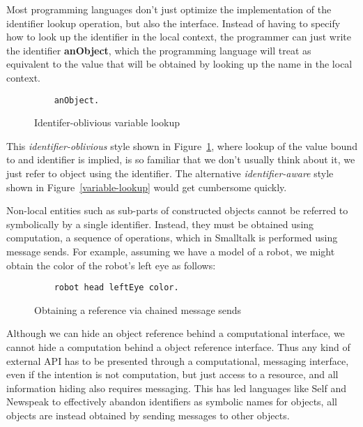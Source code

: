 \documentclass[preprint,authoryear]{acm_proc_article-sp}
\begin{document}
Most programming languages don't just optimize the implementation of the identifier
lookup operation, but also the interface.  Instead of having to specify how to
look up the identifier in the local context, the programmer can just write the
identifier {\bf anObject}, which the programming language will treat as equivalent to the
value that will be obtained by looking up the name in the local context.  


\begin{figure}[htbp]
\begin{center}
\begin{verbatim}
	anObject.
\end{verbatim}
\caption{Identifer-oblivious variable lookup}
\label{plain-identifier}
\end{center}
\end{figure}

This  {\em identifier-oblivious} style shown in Figure~\ref{plain-identifier}, where lookup of the value bound to and
identifier is implied, is so familiar that we don't usually think about it, we just
refer to object using the identifier.
  The 
alternative {\em identifier-aware} style shown in Figure~\ref{variable-lookup} would get cumbersome quickly.

Non-local entities such as sub-parts of constructed objects 
cannot be referred to symbolically by a single identifier.
Instead, they must be obtained using computation, a 
sequence of operations, which in Smalltalk is performed using message sends.
For example, assuming we have a model of a robot, we might obtain the
color of the robot's left eye as follows:

\begin{figure}[htbp]
\begin{center}
\begin{verbatim}
	robot head leftEye color.
\end{verbatim}
\caption{Obtaining a reference via chained message sends}
\label{non-local-reference}
\end{center}
\end{figure}


Although we can hide an object reference behind a computational interface, we cannot
hide a computation behind a object reference interface.
Thus any kind of external API has to be presented through a computational, messaging 
interface, even if the intention is not computation, but just access to a resource,
  and all information hiding also requires messaging.  This has led languages
like Self \cite{UngarS87} and Newspeak \cite{newspeak} to effectively abandon identifiers as symbolic names for objects, 
all objects are instead obtained by sending messages to other objects.
\end{document}
